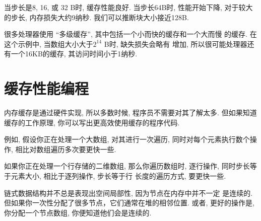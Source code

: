 \documentclass[12pt]{book}
\begin{document}
{%
当步长是8, 16, 或 32 B时, 缓存性能良好. 当步长64B时, 性能开始下降, 
对于较大的步长, 内存损失大约9纳秒. 我们可以推断块大小接近128B. 

很多处理器使用 ``多级缓存'',  其中包括一个小而快的缓存和一个大而慢
的缓存. 在这个示例中, 当数组大小大于$2^{14}$ B时, 缺失损失会略有
增加, 所以很可能处理器还有一个16KB的缓存, 其访问时间小于1纳秒.


\section{缓存性能编程}

内存缓存是通过硬件实现, 所以多数时候, 程序员不需要对其了解太多.
但如果知道缓存的工作原理, 你可以写出更高效使用缓存的程序代码. 

例如, 假设你正在处理一个大数组, 对其进行一次遍历, 
同时对每个元素执行数个操作, 相比对数组遍历多次要更快一些.

如果你正在处理一个行存储的二维数组, 那么你遍历数组时, 
逐行操作, 同时步长等于元素大小, 相比于逐列操作, 步长等于行
长度的遍历方式, 要更快一些.

链式数据结构并不总是表现出空间局部性, 因为节点在内存中并不一定
是连续的. 但如果你一次性分配了很多节点，它们通常在堆的相邻位置.
或者, 更好的操作是, 你分配一个节点数组, 你便知道他们会是连续的. 

}
\end{document}
